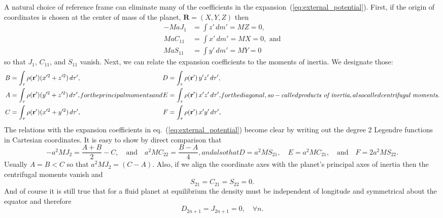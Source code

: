 \documentclass[amsmath,amsfonts,rmp,letterpaper]{revtex4}
\newcommand{\V}[1]{\mathbf{#1}} %
\newcommand{\arp}{\V{r'}}
\begin{document}
A natural choice of reference frame can eliminate many of the coefficients in the
expansion~(\ref{eq:external_potential}). First, if the origin of coordinates is
chosen at the center of mass of the planet, $\V{R}=(X,Y,Z)$ then
\begin{align*}
-MaJ_1 &= \int{z'\,dm'} = MZ = 0,\\
MaC_{11} &= \int{x'\,dm'} = MX = 0,\text{ and}\\
MaS_{11} &= \int{y'\,dm'} = MY = 0
\end{align*}
so that $J_1$, $C_{11}$, and $S_{11}$ vanish. Next, we can relate the expansion
coefficients to the moments of inertia. We designate those:
\begin{subequations}
\begin{align}
B &= \int_\tau\rho(\arp)(x'^2 + z'^2)\,d\tau',\\
A &= \int_\tau\rho(\arp)(y'^2 + z'^2)\,d\tau',\\
C &= \int_\tau\rho(\arp)(x'^2 + y'^2)\,d\tau',
\end{align}
for the principal moments and
\begin{align}
D &= \int_\tau\rho(\arp)\,y'z'\,d\tau',\\
E &= \int_\tau\rho(\arp)\,x'z'\,d\tau',\\
F &= \int_\tau\rho(\arp)\,x'y'\,d\tau',
\end{align}
for the diagonal, so-called \emph{products of inertia}, also called
\emph{centrifugal moments}.
\end{subequations}
The relations with the expansion coefficients in eq.~(\ref{eq:external_potential})
become clear by writing out the degree 2 Legendre functions in Cartesian
coordinates. It is easy to show by direct comparison that
\begin{subequations}
\begin{equation}
-a^2MJ_2 = \frac{A + B}{2} - C,\quad\text{and}\quad a^2MC_{22} = \frac{B - A}{4},
\end{equation}
and also that
\begin{equation}
D = a^2MS_{21},\quad{}E = a^2MC_{21},\quad\text{and}\quad{}F = 2a^2MS_{22}.
\end{equation}
\end{subequations}
Usually $A=B<C$ so that $a^2MJ_2=(C-A)$. Also, if we align the coordinate axes
with the planet's principal axes of inertia then the centrifugal moments vanish
and
\begin{equation}
S_{21} = C_{21} = S_{22} = 0.
\end{equation}
And of course it is still true that for a fluid planet at equilibrium the density
must be independent of longitude and symmetrical about the equator and therefore
\begin{equation}
D_{2n+1} = J_{2n+1} = 0,\quad\forall{n}.
\end{equation}
\end{document}
